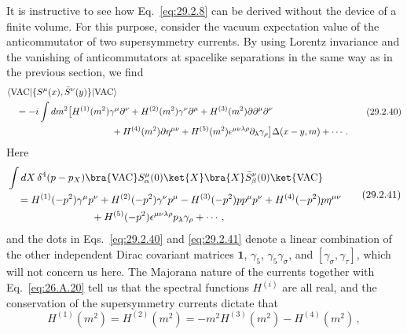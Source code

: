 It is instructive to see how Eq.~\eqref{eq:29.2.8} can be derived without
the device of a finite volume. For this purpose, consider the vacuum
expectation value of the anticommutator of two supersymmetry currents. By
using Lorentz invariance and the vanishing of anticommutators at spacelike
separations in the same way as in the previous section, we find
\begin{equation}
  \begin{aligned}
  &\langle\mathrm{VAC}\lvert
    \{S^\mu(x),\bar S^\nu(y)\}
  \rvert\mathrm{VAC}\rangle
  \\
  &\quad
  =-i\int dm^2
  \bigl[
    H^{(1)}(m^2)\gamma^\mu\partial^\nu
    +H^{(2)}(m^2)\gamma^\nu\partial^\mu
    +H^{(3)}(m^2)\sl{\partial}\partial^\mu\partial^\nu
  \\
  &\hspace{40mm}
    +H^{(4)}(m^2)\sl{\partial}\eta^{\mu\nu}
    +H^{(5)}(m^2)\epsilon^{\mu\nu\lambda\rho}
      \partial_\lambda\gamma_\rho
  \bigr]\Delta(x-y,m)
  +\cdots\,.
  \end{aligned}
  \tag{29.2.40}\label{eq:29.2.40}
\end{equation}
Here
\begin{equation}
  \begin{aligned}
  &\int dX\,\delta^4(p-p_X)
  \bra{\mathrm{VAC}} S^\mu_\alpha(0)\ket{X}
  \bra{X}\bar S^\nu_\beta(0)\ket{\mathrm{VAC}}
  \\
  &\quad
  =H^{(1)}(-p^2)\gamma^\mu p^\nu
  +H^{(2)}(-p^2)\gamma^\nu p^\mu
  -H^{(3)}(-p^2)\sl{p}p^\mu p^\nu
  +H^{(4)}(-p^2)\sl{p}\eta^{\mu\nu}
  \\
  &\hspace{29mm}
  +H^{(5)}(-p^2)\epsilon^{\mu\nu\lambda\rho}
    p_\lambda\gamma_\rho+\cdots\,,
  \end{aligned}
  \tag{29.2.41}\label{eq:29.2.41}
\end{equation}
and the dots in Eqs.~\eqref{eq:29.2.40} and \eqref{eq:29.2.41} denote a
linear combination of the other independent Dirac covariant matrices
\(\mathbf{1}\), \(\gamma_5\), \(\gamma_5\gamma_\sigma\), and
\([\gamma_\sigma,\gamma_\tau]\), which will not concern us here. The
Majorana nature of the currents together with Eq.~\eqref{eq:26.A.20}
tell us that the spectral functions \(H^{(i)}\) are all real, and the
conservation of the supersymmetry currents dictate that
\begin{equation}
  H^{(1)}(m^2)
  =H^{(2)}(m^2)
  =-m^2H^{(3)}(m^2)-H^{(4)}(m^2)\,,
  \tag{29.2.42}\label{eq:29.2.42}
\end{equation}
